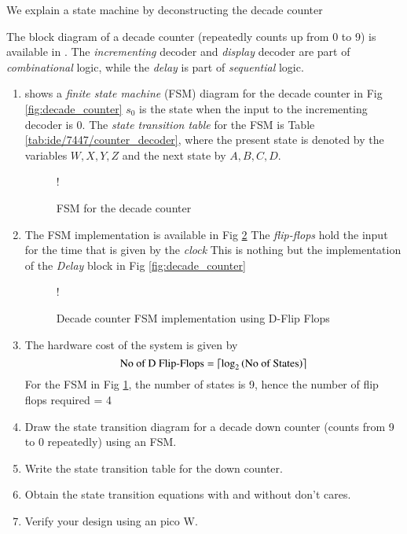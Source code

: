 We explain  a state machine by deconstructing the decade counter

The block diagram of a decade counter (repeatedly counts up from 0 to 9)
is available in .  The {\em incrementing } decoder
and {\em display} decoder are part of {\em combinational} logic, while
the {\em delay} is part of {\em sequential} logic.
%
%
\begin{enumerate}[label=\arabic*.,ref=\theenumi]
%
\item {} shows a {\em finite state machine} (FSM) diagram for the decade counter in Fig \ref{fig:decade_counter}  $s_0$ is the state when the input to the incrementing decoder is 0.  The {\em state transition table} for the FSM is Table \ref{tab:ide/7447/counter_decoder},
		where the present state is denoted by the variables $W,X,Y,Z$ and the next state by $A,B,C,D$.  
\begin{figure}[H]
\centering
\resizebox {\columnwidth} {!} {

}
\caption{FSM for the decade counter}
\label{fig:fsm_counter}
\end{figure}
\item The FSM implementation is available in Fig \ref{fig:dff}  The {\em flip-flops} hold the input for the time that is given by the {\em clock}  This is nothing but the implementation of the {\em Delay} block in Fig \ref{fig:decade_counter}
%
\begin{figure}[H]
\resizebox {\columnwidth} {!} {

}
\caption{Decade counter FSM implementation using D-Flip Flops}
\label{fig:dff}
\end{figure}
%
\item The hardware cost of the system is given by
\begin{equation}
\text{No of D Flip-Flops} = \left \lceil \log_{2}\left(\text{No of States}\right) \right \rceil
\end{equation}
For the FSM in Fig \ref{fig:fsm_counter}, the number of states is 9, hence the number of flip flops required = 4  
\item Draw the state transition diagram for 
a decade down counter (counts from 9 to 0 repeatedly) using an FSM.  
\item Write the state transition table for the down counter.
\item Obtain the state transition equations with and without don't cares.
\item Verify your design using an pico W.
\end{enumerate}


